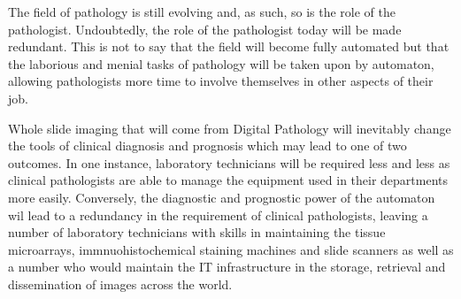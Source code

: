 \documentclass[12pt]{article}
\begin{document}
The field of pathology is still evolving and, as such, so is the role of the pathologist. Undoubtedly, the role of the 
pathologist today will be made redundant. This is not to say that the field will become fully automated but that the 
laborious and menial tasks of pathology will be taken upon by automaton, allowing pathologists more time to involve 
themselves in other aspects of their job.

Whole slide imaging that will come from Digital Pathology will inevitably 
change the tools of clinical diagnosis and prognosis which may lead to one of two outcomes. In one instance, 
laboratory technicians will be required less and less as clinical pathologists are able to manage the equipment 
used in their departments more easily. Conversely, the diagnostic and prognostic power of the automaton wil lead to 
a redundancy in the requirement of clinical pathologists, leaving a number of laboratory technicians with skills in 
maintaining the tissue microarrays, immnuohistochemical staining machines and slide scanners as well as a number 
who would maintain the IT infrastructure in the storage, retrieval and dissemination of images across the world.

\printbibliography
\end{document}
